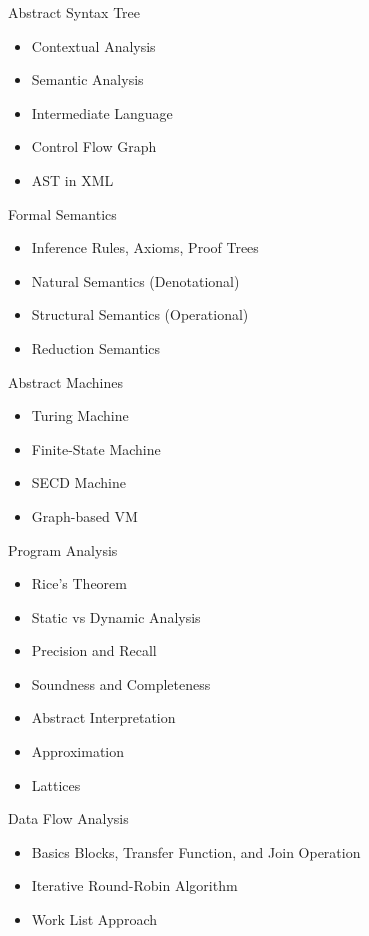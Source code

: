 \documentclass[nobrand,anonymous,nodate,nosecurity]{huawei}
\begin{document}
{\begin{lectures}
\begin{itemize}
	\end{itemize}
\item Abstract Syntax Tree
	\begin{itemize}
	\item Contextual Analysis
	\item Semantic Analysis
	\item Intermediate Language
	\item Control Flow Graph
	\item AST in XML
	\end{itemize}
\item Formal Semantics
	\begin{itemize}
	\item Inference Rules, Axioms, Proof Trees
	\item Natural Semantics (Denotational)
	\item Structural Semantics (Operational)
	\item Reduction Semantics
	\end{itemize}
\item Abstract Machines
	\begin{itemize}
	\item Turing Machine
	\item Finite-State Machine
	\item SECD Machine
	\item Graph-based VM
	\end{itemize}
\item Program Analysis
	\begin{itemize}
	\item Rice's Theorem
	\item Static vs Dynamic Analysis
	\item Precision and Recall
	\item Soundness and Completeness
	\item Abstract Interpretation
	\item Approximation
	\item Lattices
	\end{itemize}
\item Data Flow Analysis
	\begin{itemize}
	\item Basics Blocks, Transfer Function, and Join Operation
	\item Iterative Round-Robin Algorithm
	\item Work List Approach

\end{itemize}
\end{lectures}}
\end{document}
